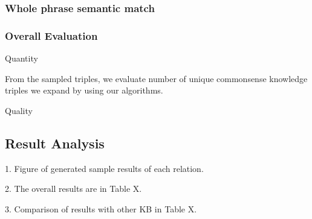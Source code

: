 \subsubsection{Whole phrase semantic match} 

\subsubsection{Overall Evaluation}
Quantity

From the sampled triples, we evaluate number of unique commonsense knowledge triples we expand by using our algorithms.

Quality




\subsection{Result Analysis}

1. Figure of generated sample results of each relation.

2. The overall results are in Table X.

3. Comparison of results with other KB in Table X.




